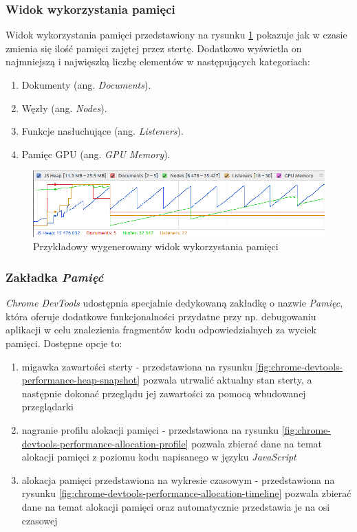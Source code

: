 \documentclass[polish, twoside, 12pt]{mwart}
\begin{document}
\subsubsection{Widok wykorzystania pamięci}

Widok wykorzystania pamięci przedstawiony na rysunku \ref{fig:chrome-devtools-performance-memory-view} pokazuje jak w czasie zmienia się ilość pamięci zajętej przez stertę. Dodatkowo wyświetla on najmniejszą i najwięszką liczbę elementów w następujących kategoriach:

\begin{enumerate}
  \item Dokumenty (ang. \emph{Documents}).
  \item Węzły (ang. \emph{Nodes}).
  \item Funkcje nasłuchujące (ang. \emph{Listeners}).
  \item Pamięc GPU (ang. \emph{GPU Memory}).
\end{enumerate}

\begin{figure}[ht]
  \includegraphics[width=\textwidth]{chrome-devtools-performance-memory-view.png}
  \caption{Przykładowy wygenerowany widok wykorzystania pamięci}
  \label{fig:chrome-devtools-performance-memory-view}
\end{figure}

\subsubsection{Zakładka \emph{Pamięć}}

\emph{Chrome DevTools} udostępnia specjalnie dedykowaną zakładkę o nazwie \emph{Pamięc}, która oferuje dodatkowe funkcjonalności przydatne przy np. debugowaniu aplikacji w celu znalezienia fragmentów kodu odpowiedzialnych za wyciek pamięci. Dostępne opcje to:

\begin{enumerate}
  \item migawka zawartości sterty - przedstawiona na rysunku \ref{fig:chrome-devtools-performance-heap-snapshot} pozwala utrwalić aktualny stan sterty, a następnie dokonać przeglądu jej zawartości za pomocą wbudowanej przeglądarki
  \item nagranie profilu alokacji pamięci - przedstawiona na rysunku \ref{fig:chrome-devtools-performance-allocation-profile} pozwala zbierać dane na temat alokacji pamięci z poziomu kodu napisanego w języku \emph{JavaScript}
  \item alokacja pamięci przedstawiona na wykresie czasowym - przedstawiona na rysunku \ref{fig:chrome-devtools-performance-allocation-timeline} pozwala zbierać dane na temat alokacji pamięci oraz automatycznie przedstawia je na osi czasowej
\end{enumerate}
\end{document}
